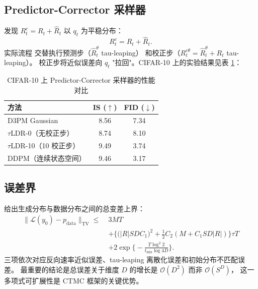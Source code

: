 \documentclass[12pt,a4paper]{ctexbook}
\theoremstyle{definition}
\begin{document}
\subsection{Predictor-Corrector 采样器}

\cite[§4.4 Proposition 4]{campbell2022ctmc} 发现 $R_t^c = R_t + \hat{R}_t$ 以 $q_t$ 为平稳分布：
\begin{equation}
R_t^c = R_t + \hat{R}_t. \label{eq:corrector-rate}
\end{equation}
实际流程 \cite[Appendix F.2]{campbell2022ctmc} 交替执行预测步（$\hat{R}_t^\theta$ tau-leaping）
和校正步（$R_t^{c\theta} = \hat{R}_t^\theta + R_t$ tau-leaping）。
校正步将近似误差向 $q_t$ "拉回"。CIFAR-10 上的实验结果见表 \ref{tab:cifar10}：

\begin{table}[htbp]
\centering
\caption{CIFAR-10 上 Predictor-Corrector 采样器的性能对比 \cite{campbell2022ctmc}}
\label{tab:cifar10}
\begin{tabular}{lcc}
\toprule
方法 & IS ($\uparrow$) & FID ($\downarrow$) \\
\midrule
D3PM Gaussian & 8.56 & 7.34 \\
$\tau$LDR-0（无校正步） & 8.74 & 8.10 \\
$\tau$LDR-10（10 校正步） & 9.49 & 3.74 \\
DDPM（连续状态空间） & 9.46 & 3.17 \\
\bottomrule
\end{tabular}
\end{table}

\subsection{误差界}

\cite[§4.5 Theorem 1]{campbell2022ctmc} 给出生成分布与数据分布之间的总变差上界：
\begin{equation}
\begin{aligned}
\|\mathcal{L}(y_0) - p_{\text{data}}\|_{\text{TV}} \le\; &3MT \\
&+ \Big\{ \big(|R| S D C_1\big)^2 + \frac{1}{2} C_2 (M + C_1 S D |R|) \Big\} \tau T \\
&+ 2 \exp\!\Big\{ -\frac{T \log^2 2}{t_{\text{mix}} \log 4D} \Big\}. \label{eq:error-bound}
\end{aligned}
\end{equation}
三项依次对应反向速率近似误差、tau-leaping 离散化误差和初始分布不匹配误差。
最重要的结论是总误差关于维度 $D$ 的增长是 $\mathcal{O}(D^2)$ 而非 $\mathcal{O}(S^D)$，
这一多项式可扩展性是 CTMC 框架的关键优势。
\end{document}
